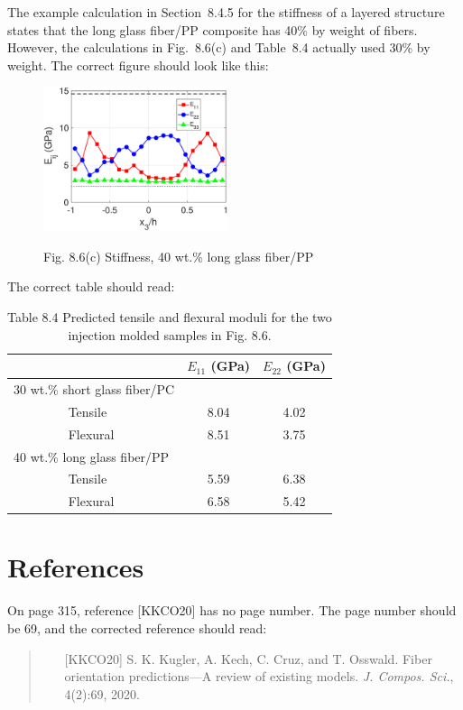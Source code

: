 \documentclass[11pt]{article}
\begin{document}
The example calculation in Section~8.4.5 for the stiffness of a layered structure states that the long glass fiber/PP composite has 40\% by weight of fibers.  However, the calculations in Fig.~8.6(c) and Table~8.4 actually used 30\% by weight.  The correct figure should look like this:
\begin{figure}[h]
   \centering
    \includegraphics[width = 0.48\textwidth, trim = 0  0 0 0, clip = true, keepaspectratio = true]{FODexample2E.eps} \\
    \caption*{Fig. 8.6(c) Stiffness, 40 wt.\% long glass fiber/PP}
\end{figure}

\newpage %
\noindent The correct table should read:
\begin{table}[h]
    \centering
     \caption*{Table 8.4 Predicted tensile and flexural moduli for the two injection molded samples in Fig. 8.6.}
         \begin{tabular}{l|c|c}
                  & $E_{11}$ (GPa)     & $E_{22}$ (GPa)   \\ 
                  \hline
                  30 wt.\% short glass fiber/PC & & \\
                  ~~~~~~~~ Tensile   & 8.04  & 4.02 \\
                  ~~~~~~~~ Flexural  & 8.51 & 3.75 \\
                  \hline
                  40 wt.\% long glass fiber/PP & & \\
                  ~~~~~~~~ Tensile   & 5.59  & 6.38 \\
                  ~~~~~~~~ Flexural  & 6.58 & 5.42 
           \end{tabular}
    \end{table}
    
\section*{References}

On page 315, reference [KKCO20] has no page number.  The page number should be 69, and the corrected reference should read:
\begin{quote}
\begin{itemize}
\item[{[KKCO20]}] S. K. Kugler, A. Kech, C. Cruz, and T. Osswald. Fiber orientation predictions—A review of existing models. \textit{J. Compos. Sci.}, 4(2):69, 2020.
\end{itemize}
\end{quote}
\end{document}
